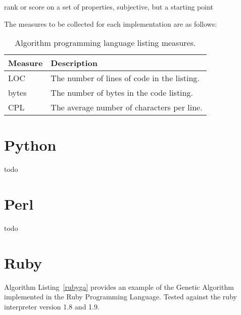 \documentclass[a4paper, 11pt]{article}
\begin{document}
rank or score on a set of properties, subjective, but a starting point

The measures to be collected for each implementation are as follows:

\begin{table}[ht]
	\centering
		\begin{tabularx}{\textwidth}{lX}
		\toprule
		\textbf{Measure} & \textbf{Description} \\ 
		\toprule
		LOC & The number of lines of code in the listing. \\
		bytes & The number of bytes in the code listing. \\
		CPL & The average number of characters per line. \\
		\bottomrule
		\end{tabularx}	
	\caption{Algorithm programming language listing measures.}
	\label{tab:measures}
\end{table}


% 
% 
\section{Python}
\label{sec:python}
todo

% 
% 
\section{Perl}
\label{sec:perl}
todo


% 
% 
\section{Ruby}
\label{sec:ruby}
Algorithm Listing~\ref{rubyga} provides an example of the Genetic Algorithm implemented in the Ruby Programming Language. Tested against the ruby interpreter version 1.8 and 1.9.
\end{document}
